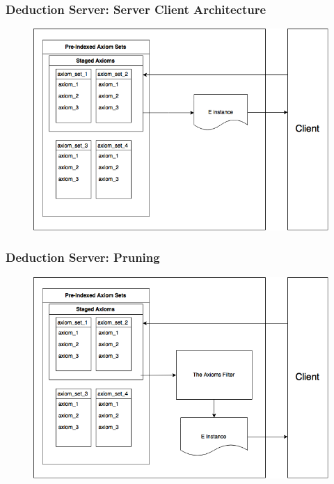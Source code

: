 \documentclass[10pt]{beamer}
\begin{document}
\begin{frame}[fragile]
\end{frame}

\begin{frame}[fragile]
  \frametitle{Deduction Server: Server Client Architecture }
  \begin{figure} \includegraphics[width=\linewidth,height=\textheight,keepaspectratio]{imgs/TheDeductionServerWithoutPrune.png} \end{figure}
\end{frame}

\begin{frame}[fragile]
  \frametitle{Deduction Server: Pruning}
    \begin{figure} \includegraphics[width=\linewidth,height=\textheight,keepaspectratio]{imgs/TheDeductionServerSingleInstance.png} \end{figure}
\end{frame}
\end{document}
